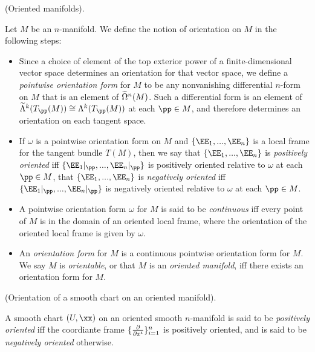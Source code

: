 \begin{defn}
     (Oriented manifolds).
    
    Let $M$ be an $n$-manifold. We define the notion of orientation on $M$ in the following steps:
    
    \begin{itemize}
        \item Since a choice of element of the top exterior power of a finite-dimensional vector space determines an orientation for that vector space, we define a \textit{pointwise orientation form} for $M$ to be any nonvanishing differential $n$-form on $M$ that is an element of $\widetilde{\Omega}^n(M)$. Such a differential form is an element of $\tLambda^k(T_\pp(M)) \cong \Lambda^k(T_\pp(M))$ at each $\pp \in M$, and therefore determines an orientation on each tangent space.
        \item If $\omega$ is a pointwise orientation form on $M$ and $\{\EE_1, ..., \EE_n\}$ is a local frame for the tangent bundle $T(M)$, then we say that $\{\EE_1, ..., \EE_n\}$ is \textit{positively oriented} iff $\{\EE_1|_\pp, ..., \EE_n|_\pp\}$ is positively oriented relative to $\omega$ at each $\pp \in M$, that $\{\EE_1, ..., \EE_n\}$ is \textit{negatively oriented} iff $\{\EE_1|_\pp, ..., \EE_n|_\pp\}$ is negatively oriented relative to $\omega$ at each $\pp \in M$.
        \item A pointwise orientation form $\omega$ for $M$ is said to be \textit{continuous} iff every point of $M$ is in the domain of an oriented local frame, where the orientation of the oriented local frame is given by $\omega$.
        \item An \textit{orientation form} for $M$ is a continuous pointwise orientation form for $M$. We say $M$ is \textit{orientable}, or that $M$ is an \textit{oriented manifold}, iff there exists an orientation form for $M$.
    \end{itemize}
\end{defn}

\begin{defn}
\label{ch::manifolds::defn::orientation_smooth_chart}
     (Orientation of a smooth chart on an oriented manifold).
    
    A smooth chart $(U, \xx)$ on an oriented smooth $n$-manifold is said to be \textit{positively oriented} iff the coordiante frame $\{\frac{\partial}{\partial x^i}\}_{i = 1}^n$ is positively oriented, and is said to be \textit{negatively oriented} otherwise.
\end{defn}

